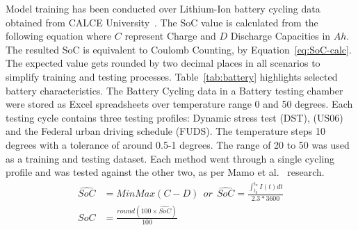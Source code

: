 Model training has been conducted over Lithium-Ion battery cycling data obtained from CALCE University~\cite{noauthor_calce_2017}.
The SoC value is calculated from the following equation where $C$ represent Charge and $D$ Discharge Capacities in $Ah$.
The resulted SoC is equivalent to Coulomb Counting, by \mbox{Equation~\ref{eq:SoC-calc}}.
The expected value gets rounded by two decimal places in all scenarios to simplify training and testing processes. 
\mbox{Table~\ref{tab:battery}} highlights selected battery characteristics.
The Battery Cycling data in a Battery testing chamber were stored as Excel spreadsheets over temperature range 0 and 50 degrees.
Each testing cycle contains three testing profiles: Dynamic stress test (DST), (US06) and the Federal urban driving schedule (FUDS).
The temperature steps 10 degrees with a tolerance of around 0.5-1 degrees.
The range of 20 to 50 was used as a training and testing dataset.
Each method went through a single cycling profile and was tested against the other two, as per Mamo et al.~\cite{mamo_long_2020} research.
\begin{equation}
    \begin{split}
        \hat{SoC} &= MinMax(C-D)\ \ or\ \ \hat{SoC} = \frac{\int_{t_0}^{t_n} I(t)dt} {2.3*3600} \\
        SoC &= \frac{round(100\times\hat{SoC})}{100}
        \label{eq:SoC-calc}
    \end{split}
\end{equation}
\begin{table}[ht]
    \renewcommand{\arraystretch}{1.3}
    \caption{Battery characteristics}
    \centering
    \label{tab:battery}
\end{table}
